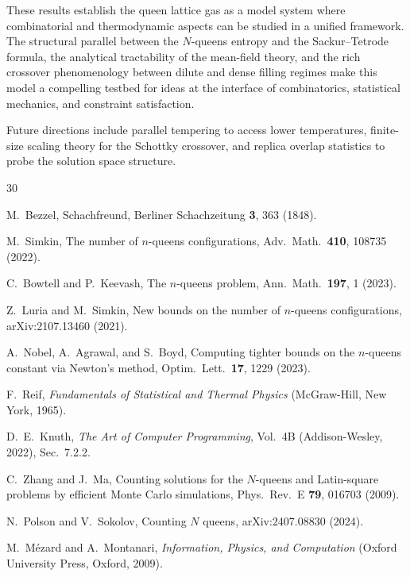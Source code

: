 \documentclass[aps, pre, reprint, amsmath, amssymb, superscriptaddress, floatfix]{revtex4-2}
\begin{document}
These results establish the queen lattice gas as a model system where
combinatorial and thermodynamic aspects can be studied in
a unified framework.  The structural parallel between the $N$-queens
entropy and the Sackur--Tetrode formula, the analytical tractability
of the mean-field theory, and the rich crossover
phenomenology between dilute and dense filling regimes make this model
a compelling testbed for ideas at the interface of combinatorics,
statistical mechanics, and constraint satisfaction.

Future directions include parallel tempering to access lower
temperatures, finite-size scaling theory for the Schottky crossover,
and replica overlap statistics to probe the solution space structure.


\begin{thebibliography}{30}

M.~Bezzel,
Schachfreund, Berliner Schachzeitung \textbf{3}, 363 (1848).

M.~Simkin,
The number of $n$-queens configurations,
Adv.\ Math.\ \textbf{410}, 108735 (2022).

C.~Bowtell and P.~Keevash,
The $n$-queens problem,
Ann.\ Math.\ \textbf{197}, 1 (2023).

Z.~Luria and M.~Simkin,
New bounds on the number of $n$-queens configurations,
arXiv:2107.13460 (2021).

A.~Nobel, A.~Agrawal, and S.~Boyd,
Computing tighter bounds on the $n$-queens constant via Newton's
method,
Optim.\ Lett.\ \textbf{17}, 1229 (2023).

F.~Reif,
\textit{Fundamentals of Statistical and Thermal Physics}
(McGraw-Hill, New York, 1965).

D.~E.~Knuth,
\textit{The Art of Computer Programming}, Vol.~4B
(Addison-Wesley, 2022), Sec.~7.2.2.

C.~Zhang and J.~Ma,
Counting solutions for the $N$-queens and Latin-square problems by
efficient Monte Carlo simulations,
Phys.\ Rev.\ E \textbf{79}, 016703 (2009).

N.~Polson and V.~Sokolov,
Counting $N$ queens,
arXiv:2407.08830 (2024).

M.~M\'ezard and A.~Montanari,
\textit{Information, Physics, and Computation}
(Oxford University Press, Oxford, 2009).


\end{thebibliography}
\end{document}
